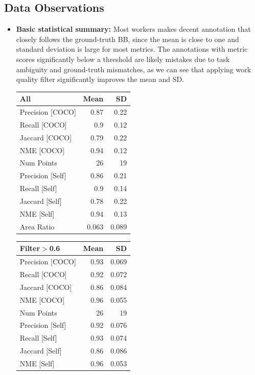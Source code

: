 \documentclass[12pt]{article}
\begin{document}
\subsection{Data Observations}
\begin{itemize}
\item \textbf{Basic statistical summary:}
Most workers makes decent annotation that closely follows the ground-truth BB, since the mean is close to one and standard deviation is large for most metrics.  The annotations with metric scores significantly below a threshold are likely mistakes due to task ambiguity and ground-truth mismatches, as we can see that applying work quality filter significantly improves the mean and SD.
\begin{table}[h]
\centering
\begin{tabular}{lrr}
\hline
 All              &   Mean &     SD \\
\hline
 Precision [COCO] &  0.87  &  0.22  \\
 Recall [COCO]    &  0.9   &  0.12  \\
 Jaccard [COCO]   &  0.79  &  0.22  \\
 NME [COCO]       &  0.94  &  0.12  \\
 Num Points       & 26     & 19     \\
 Precision [Self] &  0.86  &  0.21  \\
 Recall [Self]    &  0.9   &  0.14  \\
 Jaccard [Self]   &  0.78  &  0.22  \\
 NME [Self]       &  0.94  &  0.13  \\
 Area Ratio       &  0.063 &  0.089 \\
\hline
\end{tabular}
\begin{tabular}{lrr}
\hline
 Filter\ensuremath{>}0.6       &   Mean &     SD \\
\hline
 Precision [COCO] &  0.93  &  0.069 \\
 Recall [COCO]    &  0.92  &  0.072 \\
 Jaccard [COCO]   &  0.86  &  0.084 \\
 NME [COCO]       &  0.96  &  0.055 \\
 Num Points       & 26     & 19     \\
 Precision [Self] &  0.92  &  0.076 \\
 Recall [Self]    &  0.93  &  0.074 \\
 Jaccard [Self]   &  0.86  &  0.086 \\
 NME [Self]       &  0.96  &  0.053 \\

\end{tabular}
\end{table}
\end{itemize}
\end{document}
